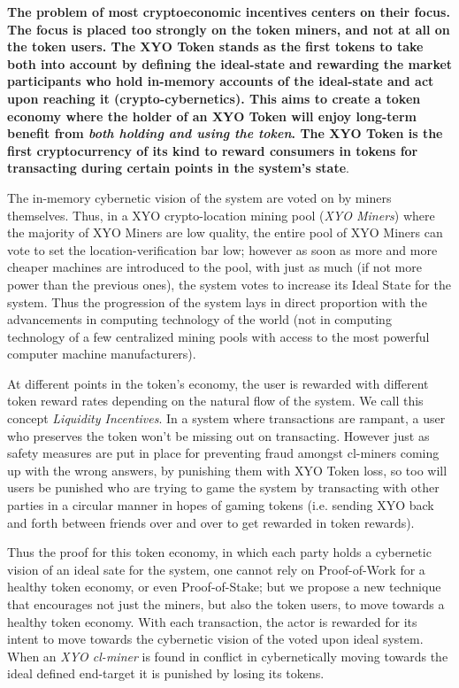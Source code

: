 \documentclass{article}
\begin{document}
\textbf{The problem of most cryptoeconomic incentives centers on their focus. The focus is placed too strongly on the token miners, and not at all on the token users. The XYO Token stands as the first tokens to take both into account by defining the ideal-state and rewarding the market participants who hold in-memory accounts of the ideal-state and act upon reaching it (crypto-cybernetics). This aims to create a token economy where the holder of an XYO Token will enjoy long-term benefit from \textit{both holding and using the token}. The XYO Token is the first cryptocurrency of its kind to reward consumers in tokens for transacting during certain points in the system's state}.

The in-memory cybernetic vision of the system are voted on by miners themselves. Thus, in a XYO crypto-location mining pool (\textit{XYO Miners})  where the majority of XYO Miners are low quality, the entire pool of XYO Miners can vote to set the location-verification bar low; however as soon as more and more cheaper machines are introduced to the pool, with just as much (if not more power than the previous ones), the system votes to increase its Ideal State for the system. Thus the progression of the system lays in direct proportion with the advancements in computing technology of the world (not in computing technology of a few centralized mining pools with access to the most powerful computer machine manufacturers).

At different points in the token's economy, the user is rewarded with different token reward rates depending on the natural flow of the system. We call this concept \textit{Liquidity Incentives}. In a system where transactions are rampant, a user who preserves the token won't be missing out on transacting. However just as safety measures are put in place for preventing fraud amongst cl-miners coming up with the wrong answers, by punishing them with XYO Token loss, so too will users be punished who are trying to game the system by transacting with other parties in a circular manner in hopes of gaming tokens (i.e. sending XYO back and forth between friends over and over to get rewarded in token rewards).

Thus the proof for this token economy, in which each party holds a cybernetic vision of an ideal sate for the system, one cannot rely on Proof-of-Work for a healthy token economy, or even Proof-of-Stake; but we propose a new technique  that encourages not just the miners, but also the token users, to move towards a healthy token economy. With each transaction, the actor is rewarded for its intent to move towards the cybernetic vision of the voted upon ideal system.  When an \textit{XYO cl-miner} is found in conflict in cybernetically moving towards the ideal defined end-target it is punished by losing its tokens.
\end{document}
